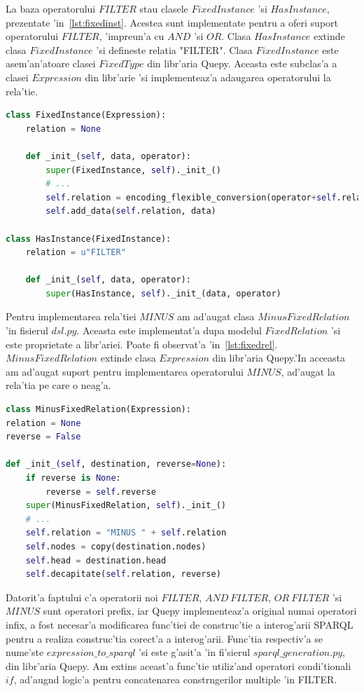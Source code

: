\documentclass[12pt,a4paper,twoside]{report}
\begin{document}
La baza operatorului $FILTER$ stau clasele $FixedInstance$ 'si $HasInstance$, prezentate 'in~\ref{lst:fixedinst}. Acestea sunt implementate pentru a oferi suport operatorului $FILTER$, 'impreun'a cu $AND$ 'si $OR$. Clasa $HasInstance$ extinde clasa $FixedInstance$ 'si defineste relatia "FILTER". Clasa $FixedInstance$ este asem'an'atoare clasei $FixedType$ din libr'aria Quepy. Aceasta este subclas'a a clasei $Expression$ din libr'arie 'si implementeaz'a adaugarea operatorului la rela'tie. 

\begin{lstlisting}[basicstyle=\footnotesize, language = Python, caption = Clasa FixedInstance 'si HasInstance, label=lst:fixedinst]
class FixedInstance(Expression):
    relation = None

    def _init_(self, data, operator):
        super(FixedInstance, self)._init_()
        # ...
        self.relation = encoding_flexible_conversion(operator+self.relation)
        self.add_data(self.relation, data)
        
class HasInstance(FixedInstance):
    relation = u"FILTER"

    def _init_(self, data, operator):
        super(HasInstance, self)._init_(data, operator)

\end{lstlisting}

Pentru implementarea rela'tiei $MINUS$ am ad'augat clasa $MinusFixedRelation$ 'in fisierul $dsl.py$. Aceasta este implementat'a dupa modelul $FixedRelation$ 'si este proprietate a libr'ariei. Poate fi observat'a 'in~\ref{lst:fixedrel}. $MinusFixedRelation$ extinde clasa $Expression$ din libr'aria Quepy.'In acceasta am ad'augat suport pentru implementarea operatorului $MINUS$, ad'augat la rela'tia pe care o neag'a. 

\begin{lstlisting}[basicstyle=\footnotesize, language = Python, caption = Clasa MinusFixedRelation, label=lst:fixedrel]
class MinusFixedRelation(Expression):
relation = None
reverse = False

def _init_(self, destination, reverse=None):
    if reverse is None:
        reverse = self.reverse
    super(MinusFixedRelation, self)._init_()
    # ...
    self.relation = "MINUS " + self.relation
    self.nodes = copy(destination.nodes)
    self.head = destination.head
    self.decapitate(self.relation, reverse)

\end{lstlisting}

Datorit'a faptului c'a operatorii noi $FILTER$, $AND\ FILTER$, $OR\ FILTER$ 'si $MINUS$ sunt operatori prefix, iar Quepy implementeaz'a original numai operatori infix, a fost necesar'a modificarea func'tiei de construc'tie a interog'arii SPARQL pentru a realiza construc'tia corect'a a interog'arii. Func'tia respectiv'a se nume'ste $expression\_to\_sparql$ 'si este g'asit'a 'in fi'sierul $sparql\_generation.py$, din libr'aria Quepy. Am extins aceast'a func'tie utiliz'and operatori condi'tionali $if$, ad'aug\ia nd logic'a pentru concatenarea constr\ia ngerilor multiple 'in FILTER.
\end{document}
